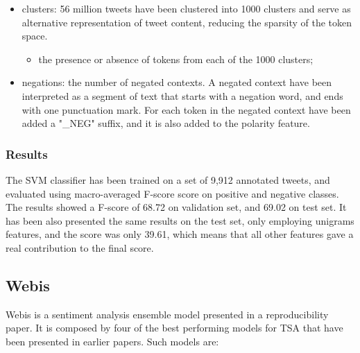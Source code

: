 \begin{itemize}
	\item clusters: 56 million tweets have been clustered into 1000 clusters and serve as alternative representation of tweet content, reducing the sparsity of the token space.
	\begin{itemize}
		\item the presence or absence of tokens from each of the 1000 clusters;
	\end{itemize}
	\item negations: the number of negated contexts. A negated context have been interpreted as a segment of text that starts with a negation word, and ends with one punctuation mark. For each token in the negated context have been added a "\_NEG" suffix, and it is also added to the polarity feature.
\end{itemize}

\subsubsection{Results}

The \ac{SVM} classifier has been trained on a set of 9,912 annotated tweets, and evaluated using macro-averaged F-score score on positive and negative classes. The results showed a F-score of 68.72 on validation set, and 69.02 on test set. It has been also presented the same results on the test set, only employing unigrams features, and the score was only 39.61, which means that all other features gave a real contribution to the final score. 


\subsection{Webis}

Webis \cite{hagen-etal-2015-webis} is a sentiment analysis ensemble model presented in a reproducibility paper. It is composed by four of the best performing models for \ac{TSA} that have been presented in earlier papers. Such models are:

